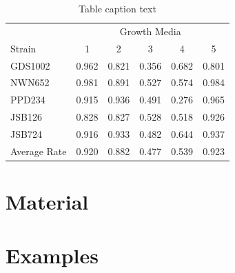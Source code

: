 \documentclass[justified]{tufte-book} %
\begin{document}
\begin{table} %
\centering %
\begin{tabular}{l c c c c c} %
\toprule %
& \multicolumn{5}{c}{Growth Media} \\ %
\cmidrule(l){2-6} %
Strain & 1 & 2 & 3 & 4 & 5\\ %
\midrule %
GDS1002 & 0.962 & 0.821 & 0.356 & 0.682 & 0.801\\ %
NWN652 & 0.981 & 0.891 & 0.527 & 0.574 & 0.984\\ %
PPD234 & 0.915 & 0.936 & 0.491 & 0.276 & 0.965\\ %
JSB126 & 0.828 & 0.827 & 0.528 & 0.518 & 0.926\\ %
JSB724 & 0.916 & 0.933 & 0.482 & 0.644 & 0.937\\ %
\midrule %
\midrule %
Average Rate & 0.920 & 0.882 & 0.477 & 0.539 & 0.923\\ %
\bottomrule %
\end{tabular}
\caption{Table caption text} %
\label{tab:template} %
\end{table}


\chapter{Material}\label{ch:material}

\chapter{Examples}\label{ch:examples}
\end{document}
